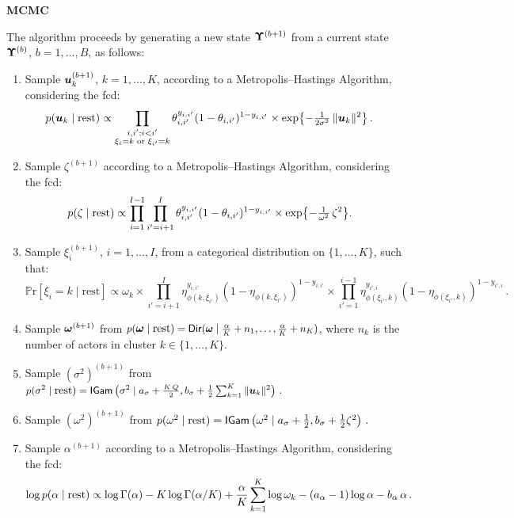 \documentclass[letterpaper,12pt,openany]{article}
\def\exp#1{{\rm exp}{#1}}
\def\frac#1#2{{{#1}\over{#2}}}
\def\le{\left}
\def\ri{\right}
\newcommand{\pr}[1]{\mathbb{P}\text{r}\left[#1\right]}
\newcommand{\ex}[1]{\exp{ \left\{ #1 \right\}}}
\def\Dir{\small{\mathsf{Dir}}}
\def\IGamd{\small{\mathsf{IGam}}}
\def\rest{\text{rest}}
\def\al{\alpha}\def\alv{\boldsymbol{\alpha}}
\def\si{\sigma}\def\siv{\boldsymbol{\sigma}}
\def\sig{\sigma}\def\sigv{\boldsymbol{\sigma}}
\def\ome{\omega}
\begin{document}
\textbf{MCMC}

The algorithm proceeds by generating a new state $\mathbf{\Upsilon}^{(b+1)}$ from a current state $\mathbf{\Upsilon}^{(b)}$, $b=1,\ldots,B$, as follows:
\begin{enumerate}
	\item Sample $\boldsymbol{u}_k^{(b+1)}$, $k=1,\ldots,K$, according to a Metropolis--Hastings Algorithm, considering the fcd:
	\begin{align*}
	p(\uv_k\mid\rest)
	&\propto\prod_{\substack{i,i':i<i'\\\xi_i = k\text{ or }\xi_{i'} = k}} \theta_{i,i'}^{y_{i,i'}}(1-\theta_{i,i'})^{1-y_{i,i'}} \times\ex{-\tfrac{1}{2\sig^2}\,\|\uv_k\|^2}\,.
	\end{align*}
	
	\item Sample $\zeta^{(b+1)}$ according to a Metropolis--Hastings Algorithm, considering the fcd:
	\begin{align*}
	p(\zeta\mid\rest)
	&\propto
	\prod_{i=1}^{I-1}\prod_{i'=i+1}^I \theta_{i,i'}^{y_{i,i'}}(1-\theta_{i,i'})^{1-y_{i,i'}}\times \ex{-\tfrac{1}{\ome^2}\,\zeta^2}.
	\end{align*}
		
	\item Sample $\xi_i^{(b+1)}$, $i = 1,\ldots,I$, from a categorical distribution on $\{1,\ldots,K\}$, such that:
	$$
	\pr{\xi_i=k\mid\rest}\propto \omega_k
	\times\prod_{i'=i+1}^I \eta_{\phi(k,\xi_{i'})}^{y_{i,i'}}(1-\eta_{\phi(k,\xi_{i'})})^{1-y_{i,i'}}
	\times\prod_{i'=1}^{i-1} \eta_{\phi(\xi_{i'},k)}^{y_{i',i}}(1-\eta_{\phi(\xi_{i'},k)})^{1-y_{i',i}}\,.
	$$
	
	\item Sample $\boldsymbol{\omega}^{(b+1)}$ from $p(\omev\mid\rest) = \Dir(\omev\mid\tfrac{\al}{K}+n_1,\ldots,\tfrac{\al}{K}+n_K)$, where $n_k$ is the number of actors in cluster $k\in\{1,\ldots,K \}$.
	
	\item Sample $(\si^2)^{(b+1)}$ from
	$p(\sig^2\mid\rest) = \IGamd\le(\sig^2 \mid a_\sig + \tfrac{K\,Q}2, b_\sig + \tfrac12 \textstyle\sum_{k=1}^K\|\uv_k\|^2 \ri)\,.$
	
	\item Sample $(\ome^2)^{(b+1)}$ from
	$p(\ome^2\mid\rest) = \IGamd\le(\ome^2 \mid a_\sig + \tfrac12, b_\sig + \tfrac12 \zeta^2 \ri)\,.$
	
	\item Sample $\alpha^{(b+1)}$ according to a Metropolis--Hastings Algorithm, considering the fcd:
	\begin{align*}
	\log p(\alpha\mid\rest)
	&\propto
	\log\Gamma(\alpha) - K\log\Gamma(\alpha/K) + \frac{\al}{K}\sum_{k=1}^K\log\omega_k - (a_\al-1)\log\al - b_\al\,\al\,.
	\end{align*}
	
\end{enumerate}
\end{document}
